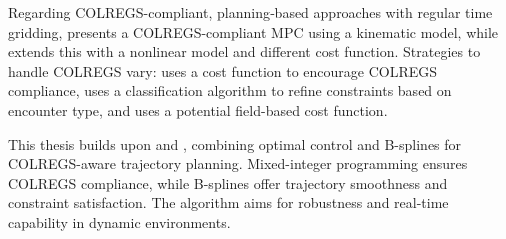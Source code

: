 Regarding \acrshort{COLREGS}-compliant, planning‐based approaches with regular time gridding,
\citet{Hagen2018} presents a COLREGS-compliant MPC using a kinematic model, while \citet{Menges2024} extends this with a nonlinear model and different cost function. Strategies to handle \acrshort{COLREGS} vary: \citet{Hagen2018} uses a cost function to encourage COLREGS compliance, \citet{Thyri2022-MPC} uses a classification algorithm to refine constraints based on encounter type, and \citet{Menges2024} uses a potential field-based cost function.

This thesis builds upon \citet{Thyri2022-MPC} and \citet{zhang2021real}, combining optimal control and B-splines for COLREGS-aware trajectory planning. Mixed-integer programming ensures COLREGS compliance, while B-splines offer trajectory smoothness and constraint satisfaction. The algorithm aims for robustness and real-time capability in dynamic environments.








